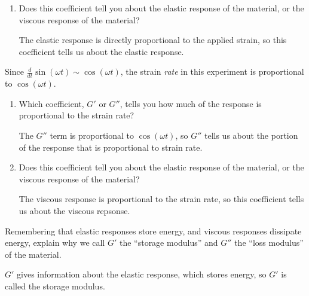 \begin{activity}
\begin{ctqs}
\begin{enumerate}
		\item Does this coefficient tell you about the elastic response of the material, or the viscous response of the material?
	
					\begin{solution}[1in]
						The elastic response is directly proportional to the applied strain, so this coefficient tells us about the elastic response.
					\end{solution}
					
			\end{enumerate}
			
		\question Since $\frac{d}{dt}\sin(\omega t) \sim \cos(\omega t)$, the strain \emph{rate} in this experiment is proportional to $\cos(\omega t)$.
		
			\begin{enumerate}
		
				\item Which coefficient, $G'$ or $G''$, tells you how much of the response is proportional to the strain rate?
	
					\begin{solution}[1in]
						The $G''$ term is proportional to $\cos(\omega t)$, so $G''$ tells us about the portion of the response that is proportional to strain rate.
					\end{solution}
		
				\item Does this coefficient tell you about the elastic response of the material, or the viscous response of the material?
	
					\begin{solution}[1in]
					
						The viscous response is proportional to the strain rate, so this coefficient tells us about the viscous repsonse.
					
					\end{solution}
					
			\end{enumerate}
		
		\question Remembering that elastic responses store energy, and viscous responses dissipate energy, explain why we call $G'$ the ``storage modulus'' and $G''$ the ``loss modulus'' of the material.
	
					\begin{solution}[2in]
					
						$G'$ gives information about the elastic response, which stores energy, so $G'$ is called the storage modulus.
						

\end{solution}
\end{ctqs}
\end{activity}
